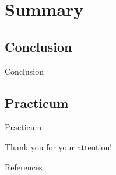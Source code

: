 \documentclass{beamer}
\begin{document}
    

    \nocite{*}

    \section{Summary} %
    \subsection{Conclusion}
    \begin{frame}{Conclusion}

    \end{frame}


    \subsection{Practicum}
    \begin{frame}{Practicum}
      \begin{center}
      \begin{huge}Thank you for your attention!\end{huge}
      \end{center}


    \end{frame}

    \begin{frame}{References}
    \end{frame}
\end{document}
